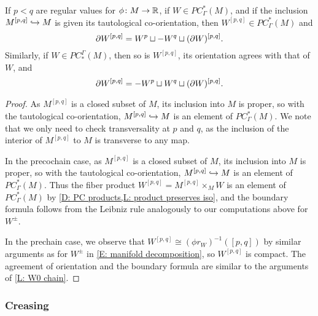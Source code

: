\begin{lemma}\label{L: Wpq cochain}
	If $p < q$ are regular values for $\phi \colon M \to \mathbb{R}$, if $W \in PC^*_\Gamma(M)$, and if the inclusion $M^{[p,q]} \hookrightarrow M$ is given its tautological co-orientation, then
	$W^{[p,q]} \in PC^*_\Gamma(M)$ and
	$$\partial W^{[p,q]} = W^p \sqcup -W^q \sqcup (\partial W)^{[p,q]}.$$
	Similarly, if $W \in PC_*^\Gamma(M)$, then so is $W^{[p,q]}$, its orientation agrees with that of $W$, and
	$$\partial W^{[p,q]} = -W^p \sqcup W^q \sqcup (\partial W)^{[p,q]}.$$
\end{lemma}
\begin{proof}
	As $M^{[p,q]}$ is a closed subset of $M$, its inclusion into $M$ is proper, so with the tautological co-orientation,  $M^{[p,q]} \hookrightarrow M$ is an element of $PC^*_\Gamma(M)$.
	We note that we only need to check transversality at $p$ and $q$, as the inclusion of the interior of $M^{[p,q]}$ to $M$ is transverse to any map.

	In the precochain case, as $M^{[p,q]}$ is a closed subset of $M$, its inclusion into $M$ is proper, so with the tautological co-orientation,  $M^{[p,q]} \hookrightarrow M$ is an element of $PC^*_\Gamma(M)$.  Thus the fiber product $W^{[p,q]} = M^{[p,q]} \times_M W$ is an element of $PC^*_\Gamma(M)$ by \cref{D: PC products,L: product preserves iso}, and the boundary formula follows from the Leibniz rule analogously to our computations above for $W^\pm$.

	In the prechain case, we observe that $W^{[p,q]} \cong (\phi r_W)^{-1}([p,q])$ by similar arguments as for $W^\pm$ in \cref{E: manifold decomposition}, so $W^{[p,q]}$ is compact.
	The agreement of orientation and the boundary formula are similar to the arguments of \cref{L: W0 chain}.
\end{proof}




\subsubsection{Creasing}\label{S: creasing}



